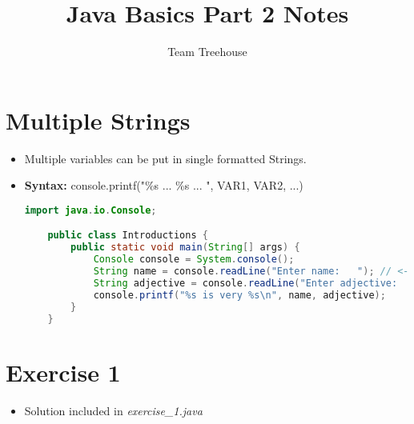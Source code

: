 \documentclass[12pt]{article}
\begin{document}
\title{Java Basics Part 2 Notes}
\author{Team Treehouse}
\maketitle

\section{Multiple Strings}

\bigskip

\begin{itemize}
    \item Multiple variables can be put in single formatted Strings.
    \item \textbf{Syntax:} console.printf("\%s ... \%s ... ", VAR1, VAR2, ...)
    \bigskip

    \begin{lstlisting}[language=java]
    import java.io.Console;

    public class Introductions {
        public static void main(String[] args) {
            Console console = System.console();
            String name = console.readLine("Enter name:   "); // <- Let's write 'Moe' here
            String adjective = console.readLine("Enter adjective:   "); // <- and 'glad to be with his love' here :)
            console.printf("%s is very %s\n", name, adjective);
        }
    }
    \end{lstlisting}

\end{itemize}

\section{Exercise 1}

\bigskip

\begin{itemize}
    \item Solution included in \textit{exercise\_1.java}
\end{itemize}
\end{document}
